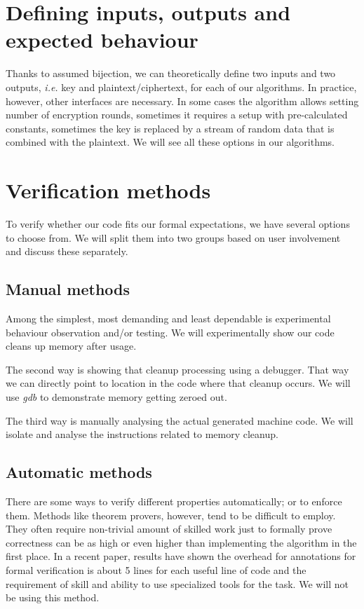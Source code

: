 \documentclass[a4paper,10pt,openright]{memoir}
\newcommand{\ie}{\emph{i.e.}\xspace}
\newcommand{\term}[1]{\textit{#1}}
\begin{document}
\section{Defining inputs, outputs and expected behaviour}

Thanks to assumed bijection, we can theoretically define two inputs and 
two outputs, \ie key and plaintext/ciphertext, for each of our 
algorithms. In practice, however, other interfaces are necessary. In 
some cases the algorithm allows setting number of encryption rounds, 
sometimes it requires a setup with pre-calculated constants, sometimes 
the key is replaced by a stream of random data that is combined with 
the plaintext. We will see all these options in our algorithms.

\section{Verification methods}

To verify whether our code fits our formal expectations, we have 
several options to choose from. We will split them into two groups 
based on user involvement and discuss these separately.

\subsection{Manual methods}

Among the simplest, most demanding and least dependable is experimental 
behaviour observation and/or testing. We will experimentally show our 
code cleans up memory after usage.

The second way is showing that cleanup processing using a debugger. 
That way we can directly point to location in the code where that 
cleanup occurs. We will use \term{gdb} to demonstrate memory getting 
zeroed out.

The third way is manually analysing the actual generated machine code. 
We will isolate and analyse the instructions related to memory cleanup.

\subsection{Automatic methods}
\label{sec:verifmet}

There are some ways to verify different properties automatically; or to 
enforce them. Methods like theorem provers, however, tend to be 
difficult to employ. They often require non-trivial amount of skilled 
work just to formally prove correctness can be as high or even higher 
than implementing the algorithm in the first place. In a recent 
paper\cite{ironclad}, results have shown the overhead for annotations 
for formal verification is about 5 lines for each useful line of code 
and the requirement of skill and ability to use specialized tools for 
the task. We will not be using this method.
\end{document}
